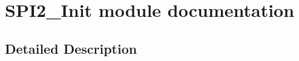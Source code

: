 \hypertarget{group___s_p_i2___init__module}{}\section{S\+P\+I2\+\_\+\+Init module documentation}
\label{group___s_p_i2___init__module}


\subsection{Detailed Description}
